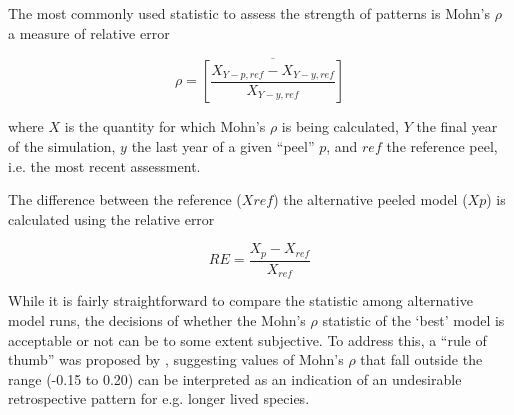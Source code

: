 The most commonly used statistic to assess the strength of patterns is Mohn’s $\rho$ a measure of relative error

\begin{equation}\rho = \overline{ \left[ \frac{X_{Y-p,ref}-X_{Y-y,ref}}{X_{Y-y,ref}} \right]}\end{equation}

where $X$ is the quantity for which Mohn’s $\rho$ is being calculated, $Y$ the final year of the simulation, $y$ the last year of a given “peel” $p$, and $ref$ the reference peel, i.e. the most recent assessment.

The difference between the reference ($X{ref}$) the alternative peeled model ($X{p}$) is calculated using the relative error 

\begin{equation} RE=\frac{X_{p}-X_{ref}}{X_{ref}} \end{equation}

While it is fairly straightforward to compare the  statistic among alternative model runs, the decisions of whether the Mohn’s $\rho$ statistic of the ‘best’ model is acceptable or not can be to some extent subjective. To address this, a “rule of thumb” was proposed by \cite{hurtado2014}, suggesting values of Mohn’s $\rho$ that fall outside the range (-0.15 to 0.20) can be interpreted as an indication of an undesirable retrospective pattern for e.g. longer lived species.
